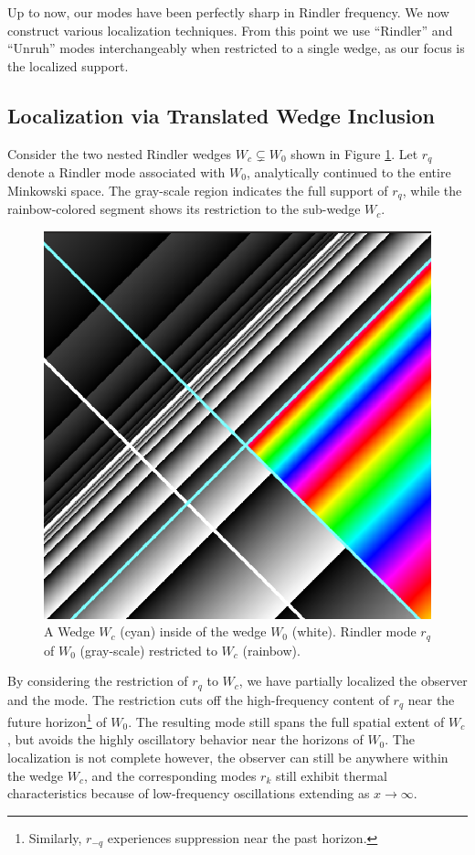 \documentclass[12pt,a4paper]{article}
\begin{document}
{Up to now, our modes have been perfectly sharp in Rindler frequency. We now construct various localization techniques. From this point we use ``Rindler'' and ``Unruh'' modes interchangeably when restricted to a single wedge, as our focus is the localized support.

\subsection{Localization via Translated Wedge Inclusion}

Consider the two nested Rindler wedges $W_c \subsetneq W_0$ shown in Figure \ref{restrict}. Let $r_q$ denote a Rindler mode associated with $W_0$, analytically continued to the entire Minkowski space. The gray-scale region indicates the full support of $r_q$, while the rainbow-colored segment shows its restriction to the sub-wedge $W_c$.

\begin{figure}[h]
  \centering
\includegraphics[scale=0.4]{wedge_in_wedge.png}
\caption{A Wedge $W_c$ (cyan) inside of the wedge $W_0$ (white). Rindler mode $r_q$ of $W_0$ (gray-scale) restricted to $W_c$ (rainbow).}
\label{restrict}
\end{figure}

By considering the restriction of $r_q$ to $W_c$, we have partially localized the observer and the mode. The restriction cuts off the high-frequency content of $r_q$ near the future horizon\footnote{Similarly, $r_{-q}$ experiences suppression near the past horizon.} of $W_0$. The resulting mode still spans the full spatial extent of $W_c$, but avoids the highly oscillatory behavior near the horizons of $W_0$.  The localization is not complete however, the observer can still be anywhere within the wedge $W_c$, and the corresponding modes $r_k$ still exhibit thermal characteristics because of low-frequency oscillations extending as $x \rightarrow \infty$.

}
\end{document}
